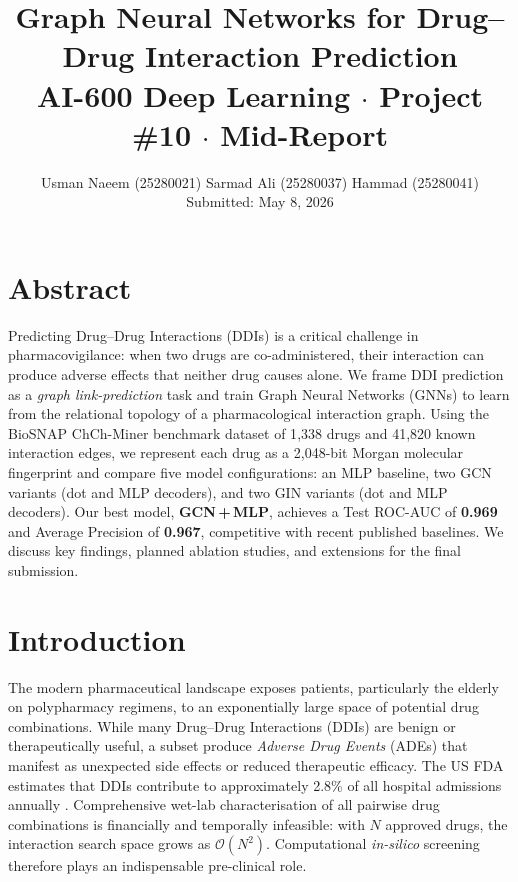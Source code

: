 \documentclass[11pt,a4paper]{article}
\title{%
  \textbf{Graph Neural Networks for Drug–Drug Interaction Prediction}\\[6pt]
  \large AI-600 Deep Learning $\cdot$ Project \#10 $\cdot$ Mid-Report
}
\author{%
  Usman Naeem (25280021) \quad Sarmad Ali (25280037) \quad Hammad (25280041)\\
  \small Submitted: May 8, 2026
}
\date{}
\begin{document}
\maketitle
\thispagestyle{empty}

\section*{Abstract}
Predicting Drug–Drug Interactions (DDIs) is a critical challenge in
pharmacovigilance: when two drugs are co-administered, their interaction
can produce adverse effects that neither drug causes alone.
We frame DDI prediction as a \emph{graph link-prediction} task and train
Graph Neural Networks (GNNs) to learn from the relational topology of a
pharmacological interaction graph.
Using the BioSNAP ChCh-Miner benchmark dataset of 1{,}338 drugs and
41{,}820 known interaction edges, we represent each drug as a 2{,}048-bit
Morgan molecular fingerprint and compare five model configurations:
an MLP baseline, two GCN variants (dot and MLP decoders), and two GIN
variants (dot and MLP decoders).
Our best model, \textbf{GCN\,+\,MLP}, achieves a Test ROC-AUC of
\textbf{0.969} and Average Precision of \textbf{0.967}, competitive with
recent published baselines.
We discuss key findings, planned ablation studies, and extensions for
the final submission.

\section{Introduction}
The modern pharmaceutical landscape exposes patients, particularly the
elderly on polypharmacy regimens, to an exponentially large space of
potential drug combinations.
While many Drug–Drug Interactions (DDIs) are benign or therapeutically
useful, a subset produce \emph{Adverse Drug Events} (ADEs) that manifest
as unexpected side effects or reduced therapeutic efficacy.
The US FDA estimates that DDIs contribute to approximately
2.8\% of all hospital admissions annually \cite{ito2004}.
Comprehensive wet-lab characterisation of all pairwise drug combinations
is financially and temporally infeasible: with $N$ approved drugs,
the interaction search space grows as $\mathcal{O}(N^2)$.
Computational \emph{in-silico} screening therefore plays an indispensable
pre-clinical role.
\end{document}
